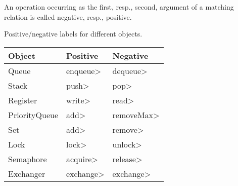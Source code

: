 An operation occurring as the first, resp., second, argument of a matching relation is called negative, resp., positive.


\newcommand{\domain}{\mathbb{D}}


\begin{example}

Positive/negative labels for different objects.\\

\begin{tabular}{l | l | l}
Object &  Positive & Negative \\\hline
Queue & \<enqueue> & \<dequeue> \\
Stack & \<push> & \<pop> \\
Register & \<write> & \<read> \\
PriorityQueue & \<add> & \<removeMax> \\
Set & \<add> & \<remove> \\
Lock & \<lock> & \<unlock> \\
Semaphore & \<acquire> & \<release> \\
Exchanger & \<exchange> & \<exchange>\\
\end{tabular}

\end{example}

